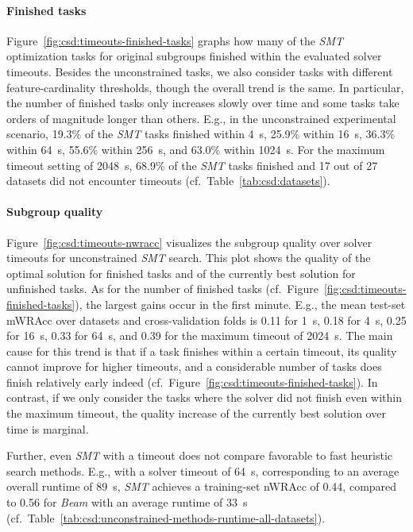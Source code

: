 \documentclass{article}
\theoremstyle{definition}
\begin{document}
\paragraph{Finished tasks}

Figure~\ref{fig:csd:timeouts-finished-tasks} graphs how many of the \emph{SMT} optimization tasks for original subgroups finished within the evaluated solver timeouts.
Besides the unconstrained tasks, we also consider tasks with different feature-cardinality thresholds, though the overall trend is the same.
In particular, the number of finished tasks only increases slowly over time and some tasks take orders of magnitude longer than others.
E.g., in the unconstrained experimental scenario, 19.3\% of the \emph{SMT} tasks finished within 4~s, 25.9\% within 16~s, 36.3\% within 64~s, 55.6\% within 256~s, and 63.0\% within 1024~s.
For the maximum timeout setting of 2048~s, 68.9\% of the \emph{SMT} tasks finished and 17 out of 27 datasets did not encounter timeouts (cf.~Table~\ref{tab:csd:datasets}).

\paragraph{Subgroup quality}

Figure~\ref{fig:csd:timeouts-nwracc} visualizes the subgroup quality over solver timeouts for unconstrained \emph{SMT} search.
This plot shows the quality of the optimal solution for finished tasks and of the currently best solution for unfinished tasks.
As for the number of finished tasks (cf.~Figure~\ref{fig:csd:timeouts-finished-tasks}), the largest gains occur in the first minute.
E.g., the mean test-set mWRAcc over datasets and cross-validation folds is 0.11 for 1~s, 0.18 for 4~s, 0.25 for 16~s, 0.33 for 64~s, and 0.39 for the maximum timeout of 2024~s.
The main cause for this trend is that if a task finishes within a certain timeout, its quality cannot improve for higher timeouts, and a considerable number of tasks does finish relatively early indeed (cf.~Figure~\ref{fig:csd:timeouts-finished-tasks}).
In contrast, if we only consider the tasks where the solver did not finish even within the maximum timeout, the quality increase of the currently best solution over time is marginal.

Further, even \emph{SMT} with a timeout does not compare favorable to fast heuristic search methods.
E.g., with a solver timeout of 64~s, corresponding to an average overall runtime of 89~s, \emph{SMT} achieves a training-set nWRAcc of 0.44, compared to 0.56 for \emph{Beam} with an average runtime of 33~s (cf.~Table~\ref{tab:csd:unconstrained-methods-runtime-all-datasets}).
\end{document}
